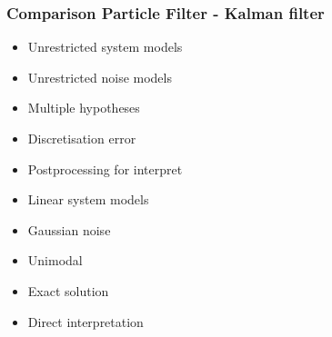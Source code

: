 \subsubsection{Comparison Particle Filter - Kalman filter}
{\footnotesize \begin{multicols}{2}
	\begin{itemize}
		\item Unrestricted system models
		\item Unrestricted noise models
		\item Multiple hypotheses
		\item Discretisation error
		\item Postprocessing for interpret
	\end{itemize}
	\columnbreak
	\begin{itemize}
		\item Linear system models
		\item Gaussian noise
		\item Unimodal
		\item Exact solution
		\item Direct interpretation
	\end{itemize}
\end{multicols}}
